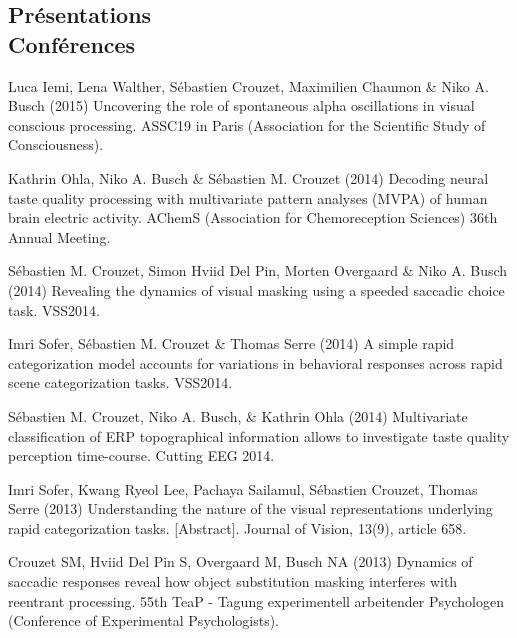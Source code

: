 \documentclass[margin,line]{resume}
\begin{document}
\begin{resume}
\vspace{3mm}	
    \section{\mysidestyle Présentations\\Conférences}

	\footnotesize %
	
	Luca Iemi, Lena Walther, Sébastien Crouzet, Maximilien Chaumon \& Niko A. Busch (2015) Uncovering the role of spontaneous alpha oscillations in visual conscious processing. ASSC19 in Paris (Association for the Scientific Study of Consciousness).
	
	\vspace{-2mm} Kathrin Ohla, Niko A. Busch \& Sébastien M. Crouzet (2014) Decoding neural taste quality processing with multivariate pattern analyses (MVPA) of human brain electric activity. AChemS (Association for Chemoreception Sciences) 36th Annual Meeting.

	\vspace{-2mm} Sébastien M. Crouzet, Simon Hviid Del Pin, Morten Overgaard \& Niko A. Busch (2014) Revealing the dynamics of visual masking using a speeded saccadic choice task. VSS2014.

	\vspace{-2mm} Imri Sofer, Sébastien M. Crouzet \& Thomas Serre (2014) A simple rapid categorization model accounts for variations in behavioral responses across rapid scene categorization tasks. VSS2014.

	\vspace{-2mm} Sébastien M. Crouzet, Niko A. Busch, \& Kathrin Ohla (2014) Multivariate classification of ERP topographical information allows to investigate taste quality perception time-course. Cutting EEG 2014.
	
	\vspace{-2mm} Imri Sofer, Kwang Ryeol Lee, Pachaya Sailamul, Sébastien Crouzet, Thomas Serre (2013) Understanding the nature of the visual representations underlying rapid categorization tasks. [Abstract]. Journal of Vision, 13(9), article 658.

	\vspace{-2mm} Crouzet SM, Hviid Del Pin S, Overgaard M, Busch NA (2013) Dynamics of saccadic responses reveal how object substitution masking interferes with reentrant processing. 55th TeaP - Tagung experimentell arbeitender Psychologen (Conference of Experimental Psychologists).


\end{resume}
\end{document}
